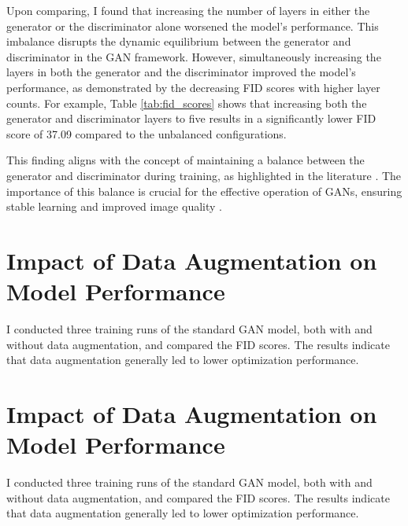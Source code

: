 Upon comparing, I found that increasing the number of layers in either the generator or the discriminator alone worsened the model’s performance. This imbalance disrupts the dynamic equilibrium between the generator and discriminator in the GAN framework. However, simultaneously increasing the layers in both the generator and the discriminator improved the model’s performance, as demonstrated by the decreasing FID scores with higher layer counts. For example, Table \ref{tab:fid_scores} shows that increasing both the generator and discriminator layers to five results in a significantly lower FID score of 37.09 compared to the unbalanced configurations.

This finding aligns with the concept of maintaining a balance between the generator and discriminator during training, as highlighted in the literature \citep{10.48550/arxiv.1703.10717}. The importance of this balance is crucial for the effective operation of GANs, ensuring stable learning and improved image quality \citep{10.48550/arxiv.2002.02112}.    


\section{Impact of Data Augmentation on Model Performance}

I conducted three training runs of the standard GAN model, both with and without data augmentation, 
and compared the FID scores. The results indicate that data augmentation generally led to lower optimization performance.


\section{Impact of Data Augmentation on Model Performance}

I conducted three training runs of the standard GAN model, both with and without data augmentation, 
and compared the FID scores. The results indicate that data augmentation generally led to lower optimization performance.


